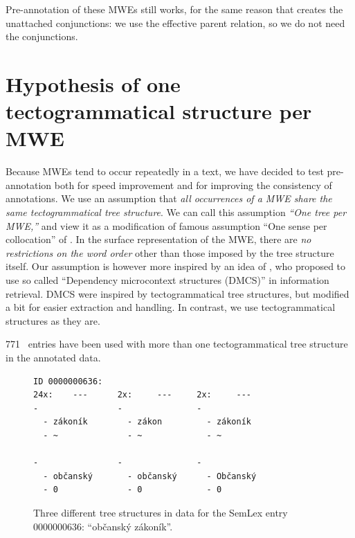 Pre-annotation of these MWEs still works, for the same reason that creates the unattached conjunctions: we use the effective parent relation, so we do not need the conjunctions. 

\section{Hypothesis of one tectogrammatical structure per MWE}
Because MWEs tend to occur repeatedly in a text, we have decided to test pre-annotation both for speed improvement and for improving the consistency of annotations. 
We use an assumption that \emph{all occurrences of a MWE share the same tectogrammatical tree structure}. We can call this assumption \emph{``One tree per MWE,''} and view it as a modification of famous assumption ``One sense per collocation'' of \citet{yarowsky:1993}. In the surface representation of the MWE, there are \emph{no restrictions on the word order} other than those imposed by the tree structure itself. Our assumption is however more inspired by an idea of \citet{holub-bohmova:2000:RANLPIR}, who proposed to use so called ``Dependency microcontext structures (DMCS)'' in information retrieval. DMCS were inspired by tectogrammatical tree structures, but modified a bit for easier extraction and handling. In contrast, we use tectogrammatical structures as they are. 

771 \semlex\ entries have been used with more than one tectogrammatical tree structure in the annotated data. 

\begin{figure}
  \begin{verbatim}
ID 0000000636:
24x:    ---      2x:     ---     2x:     --- 
-                -               - 
  - zákoník        - zákon         - zákoník
  - ~              - ~             - ~
                                 
-                -               - 
  - občanský       - občanský      - Občanský
  - 0              - 0             - 0
\end{verbatim}
\caption{Three different tree structures in data for the SemLex entry 0000000636: ``občanský zákoník''.}
\label{fig:semlex:more-tts}
\end{figure}


